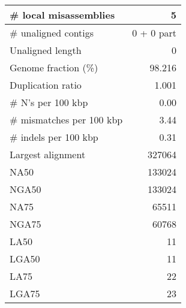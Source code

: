 \documentclass[12pt,a4paper]{article}
\begin{document}
\begin{table}[ht]
\begin{center}
\begin{tabular}{|l*{1}{|r}|}
\# local misassemblies & 5 \\ \hline
\# unaligned contigs & 0 + 0 part \\ \hline
Unaligned length & 0 \\ \hline
Genome fraction (\%) & 98.216 \\ \hline
Duplication ratio & 1.001 \\ \hline
\# N's per 100 kbp & 0.00 \\ \hline
\# mismatches per 100 kbp & 3.44 \\ \hline
\# indels per 100 kbp & 0.31 \\ \hline
Largest alignment & 327064 \\ \hline
NA50 & 133024 \\ \hline
NGA50 & 133024 \\ \hline
NA75 & 65511 \\ \hline
NGA75 & 60768 \\ \hline
LA50 & 11 \\ \hline
LGA50 & 11 \\ \hline
LA75 & 22 \\ \hline
LGA75 & 23 \\ \hline
\end{tabular}
\end{center}
\end{table}
\end{document}
